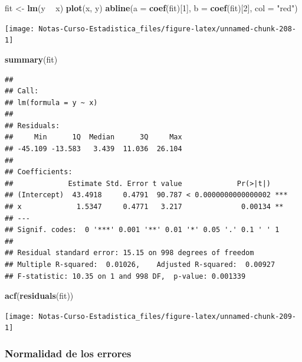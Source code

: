 \documentclass[
  12pt,
]{book}
\newenvironment{Shaded}{\begin{snugshade}}{\end{snugshade}}
\newcommand{\DataTypeTok}[1]{\textcolor[rgb]{0.13,0.29,0.53}{#1}}
\newcommand{\DecValTok}[1]{\textcolor[rgb]{0.00,0.00,0.81}{#1}}
\newcommand{\KeywordTok}[1]{\textcolor[rgb]{0.13,0.29,0.53}{\textbf{#1}}}
\newcommand{\NormalTok}[1]{#1}
\newcommand{\OperatorTok}[1]{\textcolor[rgb]{0.81,0.36,0.00}{\textbf{#1}}}
\newcommand{\StringTok}[1]{\textcolor[rgb]{0.31,0.60,0.02}{#1}}
\theoremstyle{definition}
\theoremstyle{definition}
\theoremstyle{definition}
\theoremstyle{remark}
\begin{document}
\begin{Shaded}
\begin{Highlighting}[]
\NormalTok{fit <-}\StringTok{ }\KeywordTok{lm}\NormalTok{(y }\OperatorTok{~}\StringTok{ }\NormalTok{x)}
\KeywordTok{plot}\NormalTok{(x, y)}
\KeywordTok{abline}\NormalTok{(}\DataTypeTok{a =} \KeywordTok{coef}\NormalTok{(fit)[}\DecValTok{1}\NormalTok{], }\DataTypeTok{b =} \KeywordTok{coef}\NormalTok{(fit)[}\DecValTok{2}\NormalTok{], }\DataTypeTok{col =} \StringTok{"red"}\NormalTok{)}
\end{Highlighting}
\end{Shaded}

\begin{center}\texttt{[image: Notas-Curso-Estadistica\_files/figure-latex/unnamed-chunk-208-1]} \end{center}

\begin{Shaded}
\begin{Highlighting}[]
\KeywordTok{summary}\NormalTok{(fit)}
\end{Highlighting}
\end{Shaded}

\begin{verbatim}
## 
## Call:
## lm(formula = y ~ x)
## 
## Residuals:
##     Min      1Q  Median      3Q     Max 
## -45.109 -13.583   3.439  11.036  26.104 
## 
## Coefficients:
##             Estimate Std. Error t value             Pr(>|t|)    
## (Intercept)  43.4918     0.4791  90.787 < 0.0000000000000002 ***
## x             1.5347     0.4771   3.217              0.00134 ** 
## ---
## Signif. codes:  0 '***' 0.001 '**' 0.01 '*' 0.05 '.' 0.1 ' ' 1
## 
## Residual standard error: 15.15 on 998 degrees of freedom
## Multiple R-squared:  0.01026,    Adjusted R-squared:  0.00927 
## F-statistic: 10.35 on 1 and 998 DF,  p-value: 0.001339
\end{verbatim}

\begin{Shaded}
\begin{Highlighting}[]
\KeywordTok{acf}\NormalTok{(}\KeywordTok{residuals}\NormalTok{(fit))}
\end{Highlighting}
\end{Shaded}

\begin{center}\texttt{[image: Notas-Curso-Estadistica\_files/figure-latex/unnamed-chunk-209-1]} \end{center}

\hypertarget{normalidad-de-los-errores}{%
\subsubsection{Normalidad de los errores}\label{normalidad-de-los-errores}}
\end{document}
